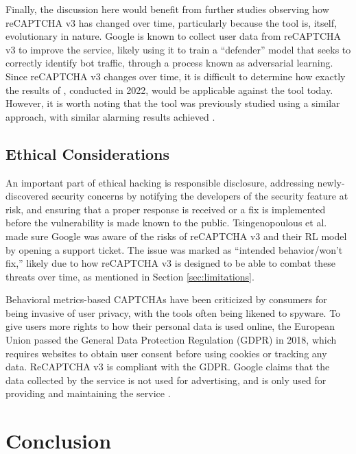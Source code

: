 \documentclass[sigplan,screen,nonacm]{acmart-tagged}
\begin{document}
Finally, the discussion here would benefit from further studies observing how reCAPTCHA v3 has changed over time, particularly because the tool is, itself, evolutionary in nature. Google is known to collect user data from reCAPTCHA v3 to improve the service, likely using it to train a ``defender'' model that seeks to correctly identify bot traffic, through a process known as adversarial learning. Since reCAPTCHA v3 changes over time, it is difficult to determine how exactly the results of \cite{tsingen}, conducted in 2022, would be applicable against the tool today. However, it is worth noting that the tool was previously studied using a similar approach, with similar alarming results achieved \cite{akrout}.

\subsection{Ethical Considerations}
\label{sec:ethical-considerations}

An important part of ethical hacking is responsible disclosure, addressing newly-discovered security concerns by notifying the developers of the security feature at risk, and ensuring that a proper response is received or a fix is implemented before the vulnerability is made known to the public. Tsingenopoulous et al. \cite{tsingen} made sure Google was aware of the risks of reCAPTCHA v3 and their RL model by opening a support ticket. The issue was marked as ``intended behavior/won't fix,'' likely due to how reCAPTCHA v3 is designed to be able to combat these threats over time, as mentioned in Section \ref{sec:limitations}.

Behavioral metrics-based CAPTCHAs have been criticized by consumers for being invasive of user privacy, with the tools often being likened to spyware. To give users more rights to how their personal data is used online, the European Union passed the General Data Protection Regulation (GDPR) in 2018, which requires websites to obtain user consent before using cookies or tracking any data. ReCAPTCHA v3 is compliant with the GDPR. Google claims that the data collected by the service is not used for advertising, and is only used for providing and maintaining the service \cite{google}.

\section{Conclusion}
\end{document}
